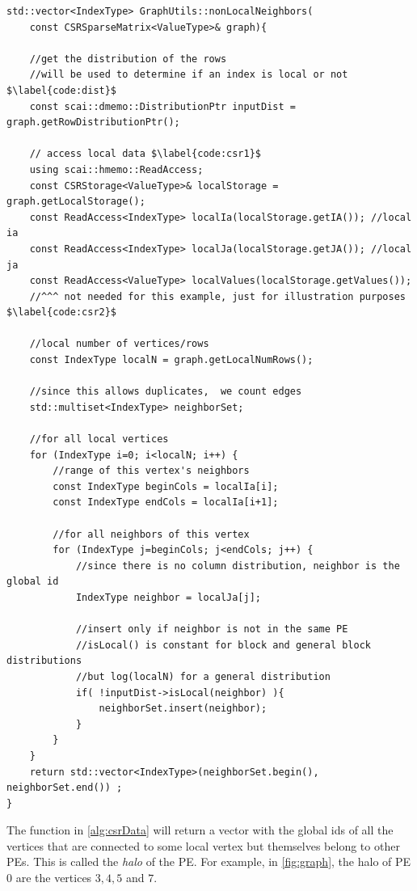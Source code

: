 \documentclass[a4paper,10pt]{article}
\begin{document}
%
\begin{algorithm}[h]%
\begin{verbatim}
std::vector<IndexType> GraphUtils::nonLocalNeighbors(
	const CSRSparseMatrix<ValueType>& graph){ 

	//get the distribution of the rows
	//will be used to determine if an index is local or not $\label{code:dist}$
	const scai::dmemo::DistributionPtr inputDist = graph.getRowDistributionPtr();
	
	// access local data $\label{code:csr1}$
	using scai::hmemo::ReadAccess;
	const CSRStorage<ValueType>& localStorage = graph.getLocalStorage();
	const ReadAccess<IndexType> localIa(localStorage.getIA()); //local ia
	const ReadAccess<IndexType> localJa(localStorage.getJA()); //local ja
	const ReadAccess<ValueType> localValues(localStorage.getValues());
	//^^^ not needed for this example, just for illustration purposes $\label{code:csr2}$
	
	//local number of vertices/rows
	const IndexType localN = graph.getLocalNumRows(); 
	
	//since this allows duplicates,  we count edges
	std::multiset<IndexType> neighborSet; 
	
	//for all local vertices
	for (IndexType i=0; i<localN; i++) {
		//range of this vertex's neighbors
		const IndexType beginCols = localIa[i];
		const IndexType endCols = localIa[i+1];
		
		//for all neighbors of this vertex
		for (IndexType j=beginCols; j<endCols; j++) {
			//since there is no column distribution, neighbor is the global id
			IndexType neighbor = localJa[j];
			
			//insert only if neighbor is not in the same PE
			//isLocal() is constant for block and general block distributions
			//but log(localN) for a general distribution
			if( !inputDist->isLocal(neighbor) ){
	        	neighborSet.insert(neighbor);
	        }
		}
	}	
	return std::vector<IndexType>(neighborSet.begin(), neighborSet.end()) ;
}
\end{verbatim}
\caption{Code to get all the non-local neighbors for every vertex. Every PEs goes over only its local
data. Of course, the returned vectors will be different for every PE.}
\label{alg:csrData}
\end{algorithm}


The function in \cref{alg:csrData} will return a vector with the global ids of all the vertices 
that are connected to some local vertex but themselves belong to other PEs.
This is called the \emph{halo} of the PE. For example, in \cref{fig:graph}, the halo of PE 0
are the vertices $3, 4, 5$ and $7$.
\end{document}
